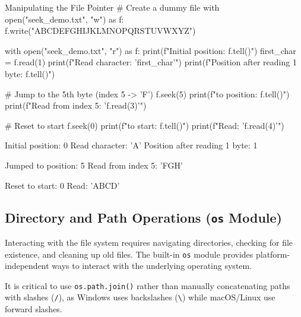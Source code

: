 \begin{pythoncode}{Manipulating the File Pointer}
# Create a dummy file
with open("seek_demo.txt", "w") as f:
    f.write("ABCDEFGHIJKLMNOPQRSTUVWXYZ")

with open("seek_demo.txt", "r") as f:
    print(f"Initial position: {f.tell()}")
    first_char = f.read(1)
    print(f"Read character: '{first_char}'")
    print(f"Position after reading 1 byte: {f.tell()}")
    
    # Jump to the 5th byte (index 5 -> 'F')
    f.seek(5)
    print(f"\nJumped to position: {f.tell()}")
    print(f"Read from index 5: '{f.read(3)}'")
    
    # Reset to start
    f.seek(0)
    print(f"\nReset to start: {f.tell()}")
    print(f"Read: '{f.read(4)}'")
\end{pythoncode}
\begin{outputbox}
Initial position: 0
Read character: 'A'
Position after reading 1 byte: 1

Jumped to position: 5
Read from index 5: 'FGH'

Reset to start: 0
Read: 'ABCD'
\end{outputbox}

\subsection{Directory and Path Operations (\texttt{os} Module)}

Interacting with the file system requires navigating directories, checking for file existence, and cleaning up old files. The built-in \texttt{os} module provides platform-independent ways to interact with the underlying operating system.

It is critical to use \texttt{os.path.join()} rather than manually concatenating paths with slashes (\texttt{/}), as Windows uses backslashes (\texttt{\textbackslash}) while macOS/Linux use forward slashes.

